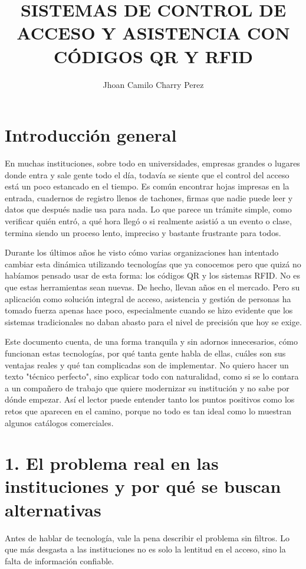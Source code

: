 \documentclass{article}
\title{SISTEMAS DE CONTROL DE ACCESO Y ASISTENCIA CON CÓDIGOS QR Y RFID}
\author{Jhoan Camilo Charry Perez}
\date{}
\begin{document}
\maketitle

\section*{Introducción general}

En muchas instituciones, sobre todo en universidades, empresas grandes o lugares donde entra y sale gente todo el día, todavía se siente que el control del acceso está un poco estancado en el tiempo. Es común encontrar hojas impresas en la entrada, cuadernos de registro llenos de tachones, firmas que nadie puede leer y datos que después nadie usa para nada. Lo que parece un trámite simple, como verificar quién entró, a qué hora llegó o si realmente asistió a un evento o clase, termina siendo un proceso lento, impreciso y bastante frustrante para todos.

Durante los últimos años he visto cómo varias organizaciones han intentado cambiar esta dinámica utilizando tecnologías que ya conocemos pero que quizá no habíamos pensado usar de esta forma: los códigos QR y los sistemas RFID. No es que estas herramientas sean nuevas. De hecho, llevan años en el mercado. Pero su aplicación como solución integral de acceso, asistencia y gestión de personas ha tomado fuerza apenas hace poco, especialmente cuando se hizo evidente que los sistemas tradicionales no daban abasto para el nivel de precisión que hoy se exige.

Este documento cuenta, de una forma tranquila y sin adornos innecesarios, cómo funcionan estas tecnologías, por qué tanta gente habla de ellas, cuáles son sus ventajas reales y qué tan complicadas son de implementar. No quiero hacer un texto "técnico perfecto", sino explicar todo con naturalidad, como si se lo contara a un compañero de trabajo que quiere modernizar su institución y no sabe por dónde empezar. Así el lector puede entender tanto los puntos positivos como los retos que aparecen en el camino, porque no todo es tan ideal como lo muestran algunos catálogos comerciales.

\section{1. El problema real en las instituciones y por qué se buscan alternativas}

Antes de hablar de tecnología, vale la pena describir el problema sin filtros. Lo que más desgasta a las instituciones no es solo la lentitud en el acceso, sino la falta de información confiable.
\end{document}
